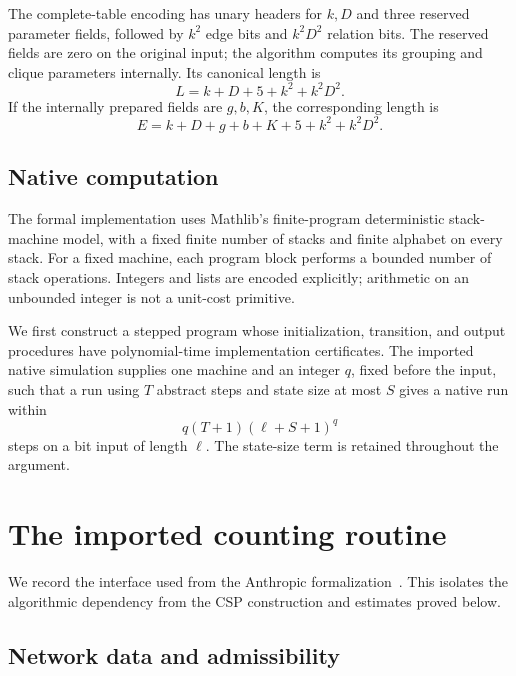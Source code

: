 \documentclass[11pt,reqno]{amsart}
\numberwithin{equation}{section}
\theoremstyle{definition}
\theoremstyle{remark}
\begin{document}
The complete-table encoding has unary headers for $k,D$ and three reserved parameter fields, followed by $k^2$ edge bits and $k^2D^2$ relation bits. The reserved fields are zero on the original input; the algorithm computes its grouping and clique parameters internally. Its canonical length is
\begin{equation}\label{eq:dense-length}
 L=k+D+5+k^2+k^2D^2.
\end{equation}
If the internally prepared fields are $g,b,K$, the corresponding length is
\begin{equation}\label{eq:prepared-length}
 E=k+D+g+b+K+5+k^2+k^2D^2.
\end{equation}

\subsection{Native computation}
The formal implementation uses Mathlib's finite-program deterministic stack-machine model, with a fixed finite number of stacks and finite alphabet on every stack. For a fixed machine, each program block performs a bounded number of stack operations. Integers and lists are encoded explicitly; arithmetic on an unbounded integer is not a unit-cost primitive.

We first construct a stepped program whose initialization, transition, and output procedures have polynomial-time implementation certificates. The imported native simulation supplies one machine and an integer $q$, fixed before the input, such that a run using $T$ abstract steps and state size at most $S$ gives a native run within
\begin{equation}\label{eq:host}
 q(T+1)(\ell+S+1)^q
\end{equation}
steps on a bit input of length $\ell$. The state-size term is retained throughout the argument.

\section{The imported counting routine}\label{sec:engine}

We record the interface used from the Anthropic formalization~\cite{AnthropicLean}. This isolates the algorithmic dependency from the CSP construction and estimates proved below.

\subsection{Network data and admissibility}\label{sec:network-contract}
\end{document}
